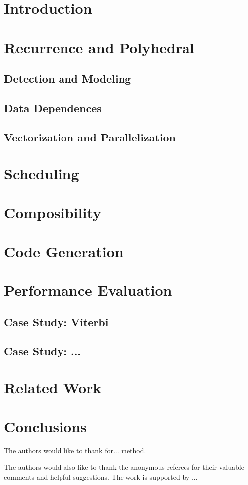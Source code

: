 \section{Introduction}


\section{Recurrence and Polyhedral}


\subsection{Detection and Modeling}

\subsection{Data Dependences}

\subsection{Vectorization and Parallelization}


\section{Scheduling}


\section{Composibility}

\section{Code Generation}

\section{Performance Evaluation}

\subsection{Case Study: Viterbi}

\subsection{Case Study: ...}
 
\section{Related Work}


\section{Conclusions}



\begin{acks}
  The authors would like to thank for... method.

  The authors would also like to thank the anonymous referees for
  their valuable comments and helpful suggestions. The work is
  supported by ...

\end{acks}
